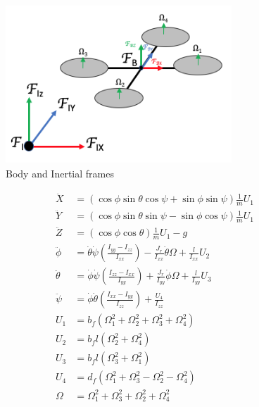 \documentclass[twocolumn,10pt]{asme2ej}
\begin{document}
\begin{figure}[t]
    \begin{center}
    \setlength{\unitlength}{0.012500in}%
    \includegraphics[width=8.5cm, height=6cm]{Images/quad_frames.png}
    \end{center}
    \caption{Body and Inertial frames}
    \label{quad_frames} 
\end{figure}

\begin{align}
    \ddot{X}      &= (\cos\phi\sin\theta\cos\psi + \sin\phi\sin\psi)\frac{1}{m}U_{1} \label{model_1}\\
    \ddot{Y}      &= (\cos\phi\sin\theta\sin\psi - \sin\phi\cos\psi)\frac{1}{m}U_{1}  \label{model_2}\\
    \ddot{Z}      &= (\cos\phi\cos\theta)\frac{1}{m}U_{1} - g \label{model_3}\\ 
    \ddot{\phi}   &= \dot{\theta}\dot{\psi}(\frac{I_{yy}-I_{zz}}{I_{xx}})-\frac{J_{r}}{I_{xx}}\dot{\theta}\Omega+\frac{l}{I_{xx}}U_{2}\label{model_4}\\
    \ddot{\theta} &= \dot{\phi}\dot{\psi}(\frac{I_{zz}-I_{xx}}{I_{yy}})+\frac{J_{r}}{I_{yy}}\dot{\phi}\Omega+\frac{l}{I_{yy}}U_{3} \label{model_5}\\
    \ddot{\psi}   &= \dot{\phi}\dot{\theta}(\frac{I_{xx}-I_{yy}}{I_{zz}})+\frac{U_{4}}{I_{zz}} \label{model_6}\\
    U_{1}  &= b_{f}(\Omega_{1}^{2} + \Omega_{2}^{2} + \Omega_{3}^{2} + \Omega_{4}^{2}) \label{model_7}\\ 
    U_{2}  &= b_{f}l(\Omega_{2}^{2} + \Omega_{4}^{2}) \label{model_8} \\
    U_{3}  &= b_{f}l(\Omega_{3}^{2} + \Omega_{1}^{2}) \label{model_9} \\
    U_{4}  &= d_{f}(\Omega_{1}^{2} + \Omega_{3}^{2} - \Omega_{2}^{2} - \Omega_{4}^{2}) \label{model_10} \\
    \Omega &= \Omega_{1}^{2} + \Omega_{3}^{2} + \Omega_{2}^{2} + \Omega_{4}^{2} \label{model_11}
\end{align}
\end{document}
